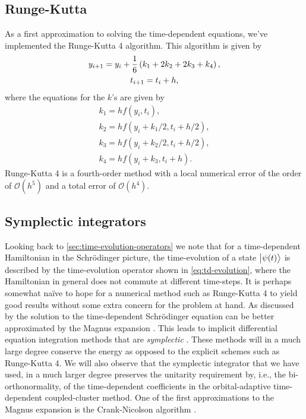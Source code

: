         \subsection{Runge-Kutta}
            As a first approximation to solving the time-dependent equations,
            we've implemented the Runge-Kutta 4 algorithm.
            This algorithm is given by \cite{wiki:rk4}
            \begin{gather}
                y_{i + 1} = y_i + \frac{1}{6}\left( 
                    k_1 + 2 k_2 + 2 k_3 + k_4
                 \right), \\
                t_{i + 1} = t_i + h,
            \end{gather}
            where the equations for the $k$'s are given by
            \begin{gather}
                k_1 = h f(y_i, t_i), \\
                k_2 = h f(y_i + k_1 / 2, t_i + h / 2), \\
                k_3 = h f(y_i + k_2 / 2, t_i + h / 2), \\
                k_4 = h f(y_i + k_3, t_i + h).
            \end{gather}
            Runge-Kutta 4 is a fourth-order method with a local numerical error
            of the order of $\mathcal{O}(h^5)$ and a total error of
            $\mathcal{O}(h^4)$.

        \subsection{Symplectic integrators}
            Looking back to \autoref{sec:time-evolution-operators} we note that
            for a time-dependent Hamiltonian in the Schrödinger picture, the
            time-evolution of a state $\ket{\psi(t)}$ is described by the
            time-evolution operator shown in \autoref{eq:td-evolution}, where
            the Hamiltonian in general does not commute at different time-steps.
            It is perhaps somewhat naïve to hope for a numerical method such as
            Runge-Kutta 4 to yield good results without some extra concern for
            the problem at hand.
            As discussed by \citeauthor{joshua-magnus} \cite{joshua-magnus} the
            solution to the time-dependent Schrödinger equation can be better
            approximated by the Magnus expansion \cite{magnus-expansion}.
            This leads to implicit differential equation integration methods
            that are \emph{symplectic} \cite{joshua-magnus}.
            These methods will in a much large degree conserve the energy as
            opposed to the explicit schemes such as Runge-Kutta 4.
            We will also observe that the symplectic integrator that we have
            used, in a much larger degree preserves the unitarity requirement
            by, i.e., the bi-orthonormality, of the time-dependent coefficients
            in the orbital-adaptive time-dependent coupled-cluster method.
            One of the first approximations to the Magnus expansion is the
            Crank-Nicolson algorithm \cite{ullrich2011time}.


